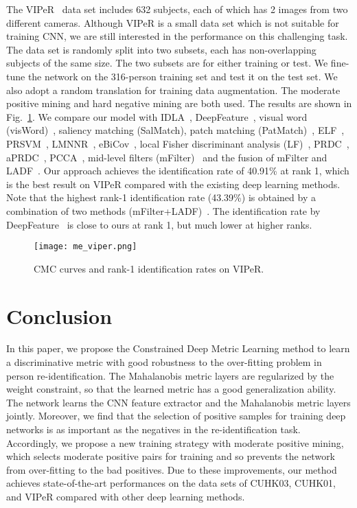 \documentclass[10pt,twocolumn,letterpaper]{article}
\begin{document}
The VIPeR~\cite{gray2007evaluating} data set includes 632 subjects, each of which has 2 images from two different cameras.
Although VIPeR is a small data set which is not suitable for training CNN, we are still interested in the performance on this challenging task.
The data set is randomly split into two subsets, each has non-overlapping subjects of the same size. The two subsets are for either training or test.
We fine-tune the network on the 316-person training set and test it on the test set.
We also adopt a random translation for training data augmentation.
The moderate positive mining and hard negative mining are both used.
The results are shown in Fig.~\ref{fig_cmc_viper}.
We compare our model with IDLA~\cite{ahmed2015improved}, DeepFeature~\cite{ding2015deep}, visual word (visWord)~\cite{zhang2014novel}, saliency matching (SalMatch), patch matching (PatMatch)~\cite{zhao2013person}, ELF~\cite{gheissari2006person}, PRSVM~\cite{bazzani2012multiple}, LMNNR~\cite{bak2011multiple}, eBiCov~\cite{ma2012bicov}, local Fisher discriminant analysis (LF)~\cite{pedagadi2013local}, PRDC~\cite{zheng2011person}, aPRDC~\cite{liu2012person}, PCCA~\cite{mignon2012pcca}, mid-level filters (mFilter)~\cite{zhao2014learning} and the fusion of mFilter and LADF~\cite{li2013learning}.
Our approach achieves the identification rate of 40.91\% at rank 1, which is the best result on VIPeR compared with the existing deep learning methods.
Note that the highest rank-1 identification rate (43.39\%) is obtained by a combination of two methods (mFilter+LADF)~\cite{li2013learning}.
The identification rate by DeepFeature~\cite{ding2015deep} is close to ours at rank 1, but much lower at higher ranks.

\begin{figure}[!htb]
  \centering
  \texttt{[image: me\_viper.png]}
  \caption{CMC curves and rank-1 identification rates on VIPeR.}
  \label{fig_cmc_viper}
\end{figure}



\section{Conclusion}
\label{section_Conclusion}

In this paper, we propose the Constrained Deep Metric Learning method to learn a discriminative metric with good robustness to the over-fitting problem in person re-identification.
The Mahalanobis metric layers are regularized by the weight constraint, so that the learned metric has a good generalization ability.
The network learns the CNN feature extractor and the Mahalanobis metric layers jointly.
Moreover, we find that the selection of positive samples for training deep networks is as important as the negatives in the re-identification task.
Accordingly, we propose a new training strategy with moderate positive mining, which selects moderate positive pairs for training and so prevents the network from over-fitting to the bad positives.
Due to these improvements, our method achieves state-of-the-art performances on the data sets of CUHK03, CUHK01, and VIPeR compared with other deep learning methods.
\end{document}
